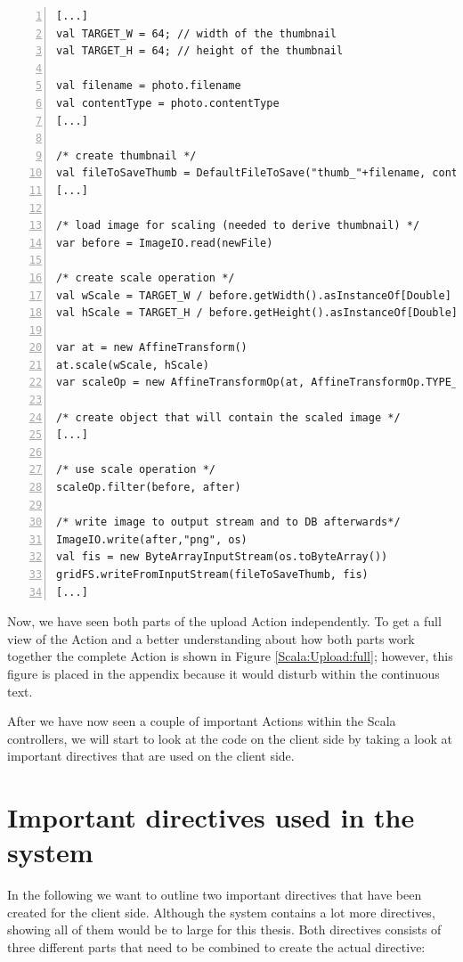 \begin{lstlisting}[numbers=left,caption={Snippet of the upload Action of the FileController for creating thumbnails},label=Scala:Upload:Thumb,frame=tlbr,breaklines]
[...]
val TARGET_W = 64; // width of the thumbnail
val TARGET_H = 64; // height of the thumbnail

val filename = photo.filename
val contentType = photo.contentType
[...]

/* create thumbnail */
val fileToSaveThumb = DefaultFileToSave("thumb_"+filename, contentType)
[...]

/* load image for scaling (needed to derive thumbnail) */
var before = ImageIO.read(newFile)

/* create scale operation */
val wScale = TARGET_W / before.getWidth().asInstanceOf[Double]
val hScale = TARGET_H / before.getHeight().asInstanceOf[Double]

var at = new AffineTransform()
at.scale(wScale, hScale)
var scaleOp = new AffineTransformOp(at, AffineTransformOp.TYPE_BILINEAR)

/* create object that will contain the scaled image */
[...]

/* use scale operation */
scaleOp.filter(before, after)

/* write image to output stream and to DB afterwards*/
ImageIO.write(after,"png", os)
val fis = new ByteArrayInputStream(os.toByteArray())
gridFS.writeFromInputStream(fileToSaveThumb, fis)
[...]
\end{lstlisting}

Now, we have seen both parts of the upload Action independently. To get a full view of the Action and a better understanding about how both parts work together the complete Action is shown in Figure \ref{Scala:Upload:full}; however, this figure is placed in the appendix because it would disturb within the continuous text.

After we have now seen a couple of important Actions within the Scala controllers, we will start to look at the code on the client side by taking a look at important directives that are used on the client side. 
\section{Important directives used in the system}
\label{usedDirectives}
In the following we want to outline two important directives that have been created for the client side. Although the system contains a lot more directives, showing all of them would be to large for this thesis. Both directives consists of three different parts that need to be combined to create the actual directive:

